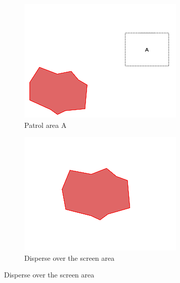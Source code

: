 \documentclass[]{article}
\begin{document}
\begin{figure}
\begin{subfigure}{0.42\textwidth}
		\includegraphics[width=\linewidth]{slide_images/Swarm_Robot_Control_-_Unknown_Number_of_Robots_0033.png}
		\caption{Patrol area A}
		\label{fig:sub2}
	\end{subfigure}%
	\begin{subfigure}{0.42\textwidth}
		\centering
		\includegraphics[width=\linewidth]{slide_images/Swarm_Robot_Control_-_Unknown_Number_of_Robots_0035.png}
		\caption{Disperse over the screen area}
		\label{fig:sub1}
	\end{subfigure}
\end{figure}
\end{document}
